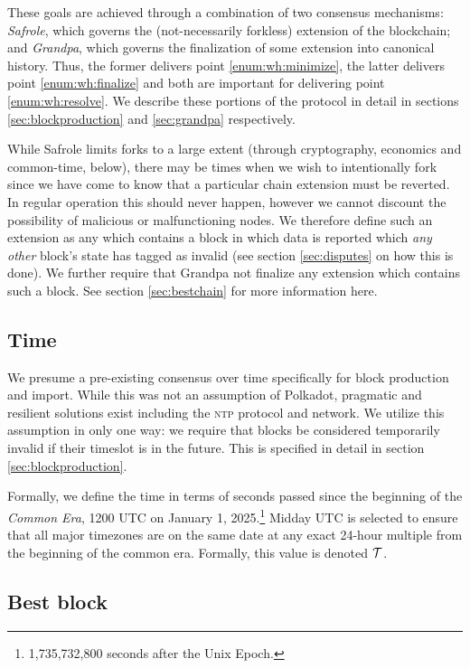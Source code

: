 These goals are achieved through a combination of two consensus mechanisms: \emph{Safrole}, which governs the (not-necessarily forkless) extension of the blockchain; and \emph{Grandpa}, which governs the finalization of some extension into canonical history. Thus, the former delivers point \ref{enum:wh:minimize}, the latter delivers point \ref{enum:wh:finalize} and both are important for delivering point \ref{enum:wh:resolve}. We describe these portions of the protocol in detail in sections \ref{sec:blockproduction} and \ref{sec:grandpa} respectively.

While Safrole limits forks to a large extent (through cryptography, economics and common-time, below), there may be times when we wish to intentionally fork since we have come to know that a particular chain extension must be reverted. In regular operation this should never happen, however we cannot discount the possibility of malicious or malfunctioning nodes. We therefore define such an extension as any which contains a block in which data is reported which \emph{any other} block's state has tagged as invalid (see section \ref{sec:disputes} on how this is done). We further require that Grandpa not finalize any extension which contains such a block. See section \ref{sec:bestchain} for more information here.

\subsection{Time}\label{sec:commonera}

We presume a pre-existing consensus over time specifically for block production and import. While this was not an assumption of Polkadot, pragmatic and resilient solutions exist including the \textsc{ntp} protocol and network. We utilize this assumption in only one way: we require that blocks be considered temporarily invalid if their timeslot is in the future. This is specified in detail in section \ref{sec:blockproduction}.

Formally, we define the time in terms of seconds passed since the beginning of the \Jam\emph{Common Era}, 1200 UTC on January 1, 2025.\footnote{1,735,732,800 seconds after the Unix Epoch.} Midday UTC is selected to ensure that all major timezones are on the same date at any exact 24-hour multiple from the beginning of the common era. Formally, this value is denoted $\mathcal{T}$.

\subsection{Best block}

